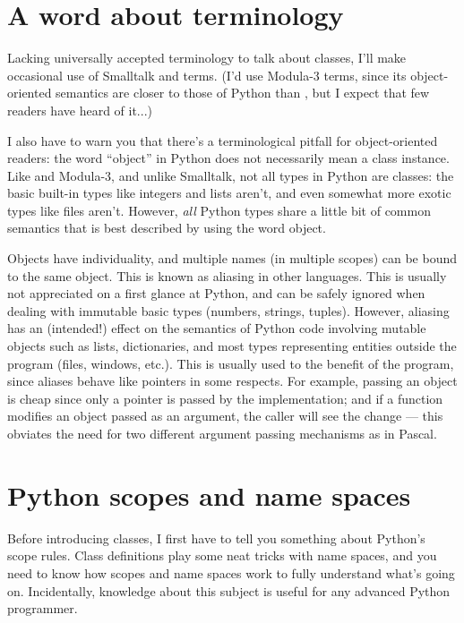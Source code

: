 \section{A word about terminology}

Lacking universally accepted terminology to talk about classes, I'll
make occasional use of Smalltalk and \Cpp{} terms.  (I'd use Modula-3
terms, since its object-oriented semantics are closer to those of
Python than \Cpp{}, but I expect that few readers have heard of it...)

I also have to warn you that there's a terminological pitfall for
object-oriented readers: the word ``object'' in Python does not
necessarily mean a class instance.  Like \Cpp{} and Modula-3, and unlike
Smalltalk, not all types in Python are classes: the basic built-in
types like integers and lists aren't, and even somewhat more exotic
types like files aren't.  However, \emph{all} Python types share a little
bit of common semantics that is best described by using the word
object.

Objects have individuality, and multiple names (in multiple scopes)
can be bound to the same object.  This is known as aliasing in other
languages.  This is usually not appreciated on a first glance at
Python, and can be safely ignored when dealing with immutable basic
types (numbers, strings, tuples).  However, aliasing has an
(intended!) effect on the semantics of Python code involving mutable
objects such as lists, dictionaries, and most types representing
entities outside the program (files, windows, etc.).  This is usually
used to the benefit of the program, since aliases behave like pointers
in some respects.  For example, passing an object is cheap since only
a pointer is passed by the implementation; and if a function modifies
an object passed as an argument, the caller will see the change --- this
obviates the need for two different argument passing mechanisms as in
Pascal.


\section{Python scopes and name spaces}

Before introducing classes, I first have to tell you something about
Python's scope rules.  Class definitions play some neat tricks with
name spaces, and you need to know how scopes and name spaces work to
fully understand what's going on.  Incidentally, knowledge about this
subject is useful for any advanced Python programmer.

